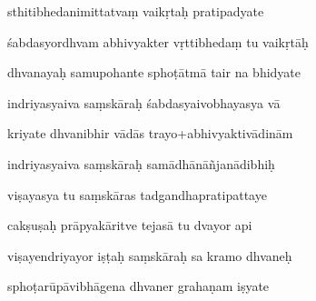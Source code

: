 \documentclass[article,12pt,a4paper]{memoir}%
\newcounter{parCount}
\begin{document}
	  
	  \pstart \leavevmode%
	sthitibhedanimittatvaṃ vaikṛtaḥ pratipadyate 
	{}
	\pend%
      

	  
	  \pstart {} śabdasyordhvam abhivyakter vṛttibhedaṃ tu vaikṛtāḥ 
	{}
	\pend%
      

	  
	  \pstart \leavevmode%
	dhvanayaḥ samupohante sphoṭātmā tair na bhidyate 
	{}
	\pend%
      

	  
	  \pstart {} indriyasyaiva saṃskāraḥ śabdasyaivobhayasya vā 
	{}
	\pend%
      

	  
	  \pstart \leavevmode%
	kriyate dhvanibhir vādās trayo+abhivyaktivādinām 
	{}
	\pend%
      

	  
	  \pstart {} indriyasyaiva saṃskāraḥ samādhānāñjanādibhiḥ 
	{}
	\pend%
      

	  
	  \pstart \leavevmode%
	viṣayasya tu saṃskāras tadgandhapratipattaye 
	{}
	\pend%
      

	  
	  \pstart {} cakṣuṣaḥ prāpyakāritve tejasā tu dvayor api 
	{}
	\pend%
      

	  
	  \pstart \leavevmode%
	viṣayendriyayor iṣṭaḥ saṃskāraḥ sa kramo dhvaneḥ 
	{}
	\pend%
      

	  
	  \pstart {} sphoṭarūpāvibhāgena dhvaner grahaṇam iṣyate 
	{}
	\pend%
      
\end{document}
